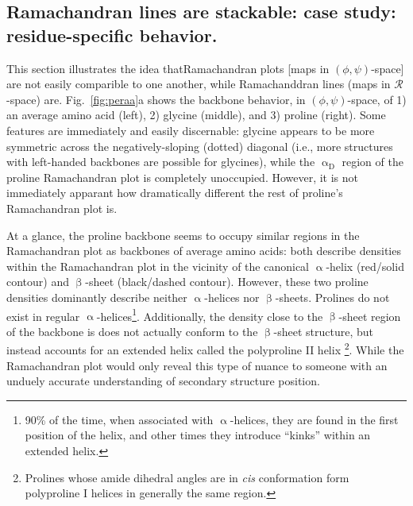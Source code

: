 \documentclass[fleqn,10pt]{wlpeerj} %
\newcommand{\Fig}[1]{Fig.~\ref{#1}}
\begin{document}
\subsection*{Ramachandran lines are stackable: case study: residue-specific behavior.}

This section illustrates the idea thatRamachandran plots [maps in $(\phi,\psi)$-space] are not easily comparible to one another, while Ramachanddran lines (maps in $\mathcal{R}$-space) are. \Fig{fig:peraa}a shows the backbone behavior, in $(\phi,\psi)$-space, of 1) an average amino acid (left), 2) glycine (middle), and 3) proline (right). Some features are immediately and easily discernable: glycine appears to be more symmetric across the negatively-sloping (dotted) diagonal (i.e., more structures with left-handed backbones are possible for glycines), while the $\upalpha_\textrm{D}$ region of the proline Ramachandran plot is completely unoccupied. However, it is not immediately apparant how dramatically different the rest of proline's Ramachandran plot is. 

At a glance, the proline backbone seems to occupy similar regions in the Ramachandran plot as backbones of average amino acids: both describe densities within the Ramachandran plot in the vicinity of the canonical $\upalpha$-helix (red/solid contour) and $\upbeta$-sheet (black/dashed contour). However, these two proline densities dominantly describe neither $\upalpha$-helices nor $\upbeta$-sheets. Prolines do not exist in regular $\upalpha$-helices\footnote{90\% of the time, when associated with $\upalpha$-helices, they are found in the first position of the helix, and other times they introduce ``kinks'' within an extended helix.}. Additionally, the density close to the $\upbeta$-sheet region of the backbone is does not actually conform to the $\upbeta$-sheet structure, but instead accounts for an extended helix called the polyproline II helix \citep{Adzhubei1993}\footnote{Prolines whose amide dihedral angles are in \textit{cis} conformation form polyproline I helices in generally the same region.}. While the Ramachandran plot would only reveal this type of nuance to someone with an unduely accurate understanding of secondary structure position. 
\end{document}
